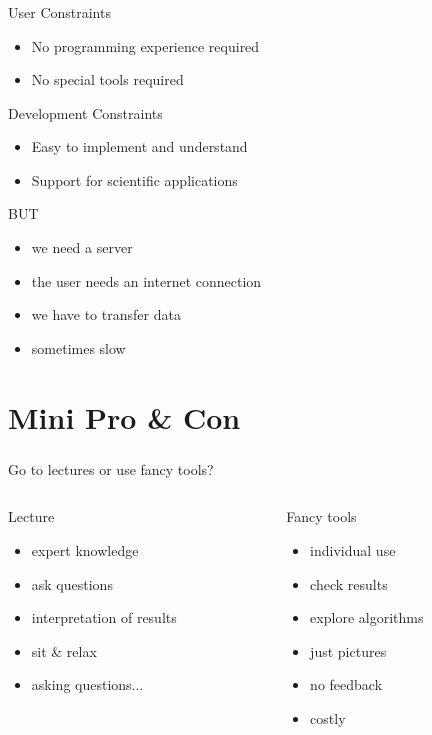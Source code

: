 \documentclass[11pt]{beamer}
\newcommand{\cmark}{\ding{51}}%
\newcommand{\xmark}{\ding{55}}%
\newcommand{\xitem}{\item[\textcolor{red}{\xmark}]}
\newcommand{\citem}{\item[\textcolor{olive}{\cmark}]}
\begin{document}
\begin{frame}
\frametitle{\insertsubsection}
\begin{block}{User Constraints}
\begin{itemize}
\citem No programming experience required
\citem No special tools required
\end{itemize}
\end{block}

\begin{block}{Development Constraints}
\begin{itemize}
\citem Easy to implement and understand
\citem Support for scientific applications
\end{itemize}
\end{block}

\begin{block}{BUT}
\begin{itemize}
\item we need a server
\item the user needs an internet connection
\item we have to transfer data
\item sometimes slow
\end{itemize}
\end{block}
\end{frame}

\section{Mini Pro \& Con}
\begin{frame}
\frametitle{\insertsection}
\Large{Go to lectures or use fancy tools?}
\pause
\begin{columns}
\begin{column}[t]{.45\textwidth}
\begin{block}{Lecture}
\begin{itemize}
\citem expert knowledge
\citem ask questions
\citem interpretation of results
\xitem sit \& relax
\xitem asking questions...
\end{itemize}
\end{block}
\end{column}
\begin{column}[t]{.45\textwidth}
\begin{block}{Fancy tools}
\begin{itemize}
\citem individual use
\citem check results
\citem explore algorithms
\xitem just pictures
\xitem no feedback
\xitem costly
\end{itemize}
\end{block}
\end{column}
\end{columns}
\end{frame}
\end{document}
